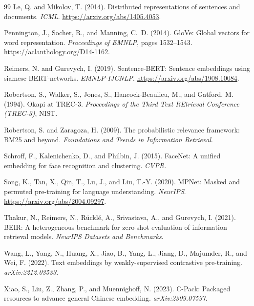 \documentclass[12pt, a4paper]{article}
\begin{document}
\begin{thebibliography}{99}
Le, Q. and Mikolov, T. (2014).
Distributed representations of sentences and documents.
\textit{ICML}. \url{https://arxiv.org/abs/1405.4053}.

Pennington, J., Socher, R., and Manning, C.~D. (2014).
Glo{V}e: Global vectors for word representation.
\textit{Proceedings of EMNLP}, pages 1532--1543.
\url{https://aclanthology.org/D14-1162}.

Reimers, N. and Gurevych, I. (2019).
Sentence-BERT: Sentence embeddings using siamese BERT-networks.
\textit{EMNLP-IJCNLP}. \url{https://arxiv.org/abs/1908.10084}.

Robertson, S., Walker, S., Jones, S., Hancock-Beaulieu, M., and Gatford, M. (1994).
Okapi at TREC-3.
\textit{Proceedings of the Third Text REtrieval Conference (TREC-3)}, NIST.

Robertson, S. and Zaragoza, H. (2009).
The probabilistic relevance framework: BM25 and beyond.
\textit{Foundations and Trends in Information Retrieval}.

Schroff, F., Kalenichenko, D., and Philbin, J. (2015).
FaceNet: A unified embedding for face recognition and clustering.
\textit{CVPR}.

Song, K., Tan, X., Qin, T., Lu, J., and Liu, T.-Y. (2020).
MPNet: Masked and permuted pre-training for language understanding.
\textit{NeurIPS}. \url{https://arxiv.org/abs/2004.09297}.

Thakur, N., Reimers, N., R\"{u}ckl\'{e}, A., Srivastava, A., and
Gurevych, I. (2021).
BEIR: A heterogeneous benchmark for zero-shot evaluation of information
retrieval models.
\textit{NeurIPS Datasets and Benchmarks}.

Wang, L., Yang, N., Huang, X., Jiao, B., Yang, L., Jiang, D., Majumder, R.,
and Wei, F. (2022).
Text embeddings by weakly-supervised contrastive pre-training.
\textit{arXiv:2212.03533}.

Xiao, S., Liu, Z., Zhang, P., and Muennighoff, N. (2023).
C-Pack: Packaged resources to advance general Chinese embedding.
\textit{arXiv:2309.07597}.

\end{thebibliography}
\end{document}
